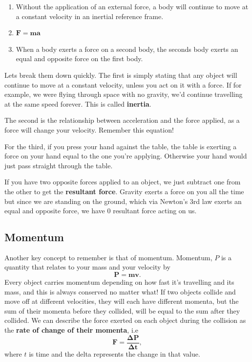 \documentclass[11pt, titlepage]{article}
\begin{document}
\begin{enumerate}
\item{Without the application of an external force, a body will continue to move at a constant velocity in an inertial reference frame.}
\item{$\mathbf{F=ma}$}
\item{When a body exerts a force on a second body, the seconds body exerts an equal and opposite force on the first body.}
\end{enumerate}

Lets break them down quickly.  The first is simply stating that any object will continue to move at a constant velocity, unless you act on it with a force.  If for example, we were flying through space with no gravity, we'd continue travelling at the same speed forever.  This is called \textbf{inertia}.

The second is the relationship between acceleration and the force applied, as a force will change your velocity.  Remember this equation!

For the third, if you press your hand against the table, the table is exerting a force on your hand equal to the one you're applying.  Otherwise your hand would just pass straight through the table.

If you have two opposite forces applied to an object, we just subtract one from the other to get the \textbf{resultant force}.  Gravity exerts a force on you all the time but since we are standing on the ground, which via Newton's 3rd law exerts an equal and opposite force, we have 0 resultant force acting on us.

\subsection{Momentum}
Another key concept to remember is that of momentum.  Momentum, $P$ is a quantity that relates to your mass and your velocity by
\begin{equation*}
\mathbf{P=mv}.
\end{equation*}
Every object carries momentum depending on how fast it's travelling and its mass, and this is always conserved no matter what!  If two objects collide and move off at different velocities, they will each have different momenta, but the sum of their momenta before they collided, will be equal to the sum after they collided.  We can describe the force exerted on each object during the collision as the \textbf{rate of change of their momenta}, i.e
\begin{equation*}
\mathbf{F=\frac{\Delta P}{\Delta t}},
\end{equation*} 
where $t$ is time and the delta represents the change in that value.
\end{document}
